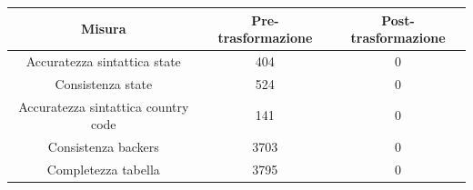 \begin{tabular}{|c|c|c|}
	\hline 
	Misura & Pre-trasformazione & Post-trasformazione \\ 
	\hline 
	Accuratezza sintattica state & 404 & 0 \\ 
	\hline 
	Consistenza state & 524 & 0 \\ 
	\hline 
	Accuratezza sintattica country code & 141 & 0 \\ 
	\hline 
	Consistenza backers & 3703 & 0 \\ 
	\hline 
	Completezza tabella & 3795 & 0 \\ 
	\hline 
\end{tabular} 

